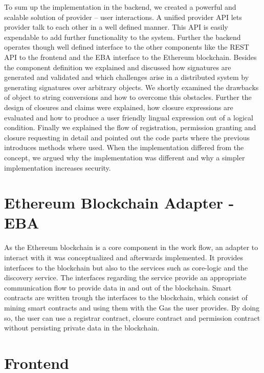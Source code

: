 To sum up the implementation in the backend, we created a powerful and scalable solution of provider – user interactions. A unified provider API lets provider talk to each other in a well defined manner. This API is easily expendable to add further functionality to the system. Further the backend operates though well defined interface to the other components like the REST API to the frontend and the EBA interface to the Ethereum blockchain. Besides the component definition we explained and discussed how signatures are generated and validated and which challenges arise in a distributed system by generating signatures over arbitrary objects.  We shortly examined the drawbacks of object to string conversions and how to overcome this obstacles. Further the design of closures and claims were explained, how closure expressions are evaluated and how to produce a user friendly lingual expression out of a logical condition. Finally we explained the flow of registration, permission granting and closure requesting in detail and pointed out the code parts where the previous introduces methods where used. When the implementation differed from the concept, we argued why the implementation was different and why a simpler implementation increases security.


\section{Ethereum Blockchain Adapter - EBA}
\label{sec:eba}

As the Ethereum blockchain is a core component in the work flow, an adapter to interact with it was conceptualized and
afterwards implemented.
It provides interfaces to the blockchain but also to the services such as core-logic and the discovery service.
The interfaces regarding the service provide an appropriate communication flow to provide data in and out of the blockchain.
Smart contracts are written trough the interfaces to the blockchain, which consist of mining smart contracts and using them
with the Gas the user provides.
By doing so, the user can use a registrar contract, closure contract and permission contract without persisting private
data in the blockchain.


\section{Frontend}
\label{sec:frontend}


